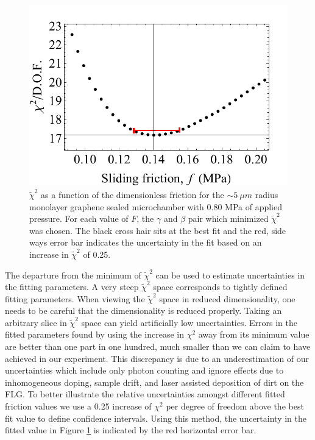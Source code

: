 \begin{figure}
	\begin{center}
	\includegraphics{Figs_Fit/2013-09-05_Fit_101psi_ErrorBar_ForThesis.pdf}
	\end{center}
	\caption[Goodness of fit metric used to determine friction]{\label{fig:Fit:chispace}
	$\tilde{\chi}^2$ as a function of the dimensionless friction for the $\sim 5 \ \mu m$ radius monolayer graphene sealed microchamber with 0.80 MPa of applied pressure.
	For each value of $F$, the $\gamma$ and $\beta$ pair which minimized $\tilde{\chi}^2$ was chosen.
	The black cross hair sits at the best fit and the red, side ways error bar indicates the uncertainty in the fit based on an increase in $\tilde{\chi}^2$ of 0.25.
	}
\end{figure}

The departure from the minimum of $\tilde{\chi}^2$ can be used to estimate uncertainties in the fitting parameters.
A very steep $\tilde{\chi}^2$ space corresponds to tightly defined fitting parameters.
When viewing the $\tilde{\chi}^2$ space in reduced dimensionality, one needs to be careful that the dimensionality is reduced properly.
Taking an arbitrary slice in $\tilde{\chi}^2$ space can yield artificially low uncertainties.
Errors in the fitted parameters found by using the increase in $\chi^2$ away from its minimum value \cite{Press2007} are better than one part in one hundred, much smaller than we can claim to have achieved in our experiment.
This discrepancy is due to an underestimation of our uncertainties which include only photon counting and ignore effects due to inhomogeneous doping, sample drift, and laser assisted deposition of dirt on the FLG.
To better illustrate the relative uncertainties amongst different fitted friction values we use a 0.25 increase of $\chi^2$ per degree of freedom above the best fit value to define confidence intervals.
Using this method, the uncertainty in the fitted value in Figure \ref{fig:Fit:chispace} is indicated by the red horizontal error bar.
